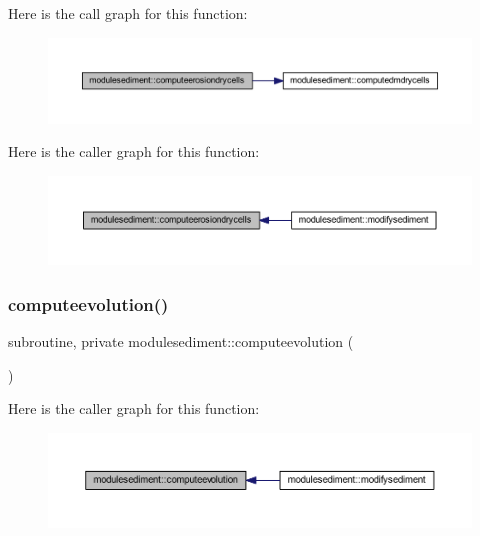 Here is the call graph for this function\+:\nopagebreak
\begin{figure}[H]
\begin{center}
\leavevmode
\includegraphics[width=350pt]{namespacemodulesediment_a8f039d145535e96ceb83a4518f8f82a6_cgraph}
\end{center}
\end{figure}
Here is the caller graph for this function\+:\nopagebreak
\begin{figure}[H]
\begin{center}
\leavevmode
\includegraphics[width=350pt]{namespacemodulesediment_a8f039d145535e96ceb83a4518f8f82a6_icgraph}
\end{center}
\end{figure}
\mbox{\label{namespacemodulesediment_aba93d4f48399841f747d4c862880f365}} 
\subsubsection{\texorpdfstring{computeevolution()}{computeevolution()}}
{\footnotesize\ttfamily subroutine, private modulesediment\+::computeevolution (\begin{DoxyParamCaption}{ }\end{DoxyParamCaption})\hspace{0.3cm}{\ttfamily [private]}}

Here is the caller graph for this function\+:\nopagebreak
\begin{figure}[H]
\begin{center}
\leavevmode
\includegraphics[width=350pt]{namespacemodulesediment_aba93d4f48399841f747d4c862880f365_icgraph}
\end{center}
\end{figure}
\mbox{\label{namespacemodulesediment_a1e2e55857d3719dbc4a034eb10281e6c}} 
